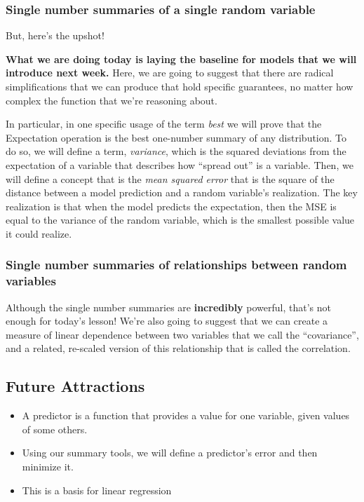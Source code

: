 \documentclass[
]{book}
\providecommand{\tightlist}{%
  \setlength{\itemsep}{0pt}\setlength{\parskip}{0pt}}
\theoremstyle{definition}
\theoremstyle{definition}
\theoremstyle{definition}
\theoremstyle{definition}
\theoremstyle{remark}
\begin{document}
\subsubsection{Single number summaries of a single random variable}\label{single-number-summaries-of-a-single-random-variable}

But, here's the upshot!

\textbf{What we are doing today is laying the baseline for models that we will introduce next week.} Here, we are going to suggest that there are radical simplifications that we can produce that hold specific guarantees, no matter how complex the function that we're reasoning about.

In particular, in one specific usage of the term \emph{best} we will prove that the Expectation operation is the best one-number summary of any distribution. To do so, we will define a term, \emph{variance}, which is the squared deviations from the expectation of a variable that describes how ``spread out'' is a variable. Then, we will define a concept that is the \emph{mean squared error} that is the square of the distance between a model prediction and a random variable's realization. The key realization is that when the model predicts the expectation, then the MSE is equal to the variance of the random variable, which is the smallest possible value it could realize.

\subsubsection{Single number summaries of relationships between random variables}\label{single-number-summaries-of-relationships-between-random-variables}

Although the single number summaries are \textbf{incredibly} powerful, that's not enough for today's lesson! We're also going to suggest that we can create a measure of linear dependence between two variables that we call the ``covariance'', and a related, re-scaled version of this relationship that is called the correlation.

\subsection{Future Attractions}\label{future-attractions}

\begin{itemize}
\tightlist
\item
  A predictor is a function that provides a value for one variable, given values of some others.
\item
  Using our summary tools, we will define a predictor's error and then minimize it.
\item
  This is a basis for linear regression
\end{itemize}
\end{document}

